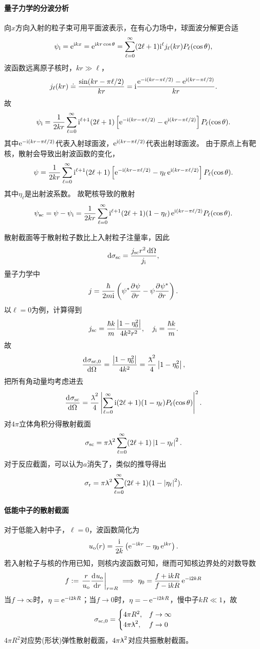 \paragraph{量子力学的分波分析}
向$x$方向入射的粒子束可用平面波表示，在有心力场中，球面波分解更合适
\[
	\psi_{\mathrm{i}}=\mathop{}\!\mathrm{e}^{\mathrm{i} kx}=\mathop{}\!\mathrm{e}^{\mathrm{i} kr\cos\theta}=\sum_{\ell=0}^\infty(2\ell+1)\mathrm{i}^\ell j_\ell(kr)P_\ell(\cos\theta),
\]
波函数远离原子核时，$kr\gg\ell$，
\[
	j_\ell(kr)\doteq\frac{\sin(kr-\pi\ell/2)}{kr}=\mathrm{i}\frac{\mathop{}\!\mathrm{e}^{-\mathrm{i}(kr-\pi\ell/2)}-\mathop{}\!\mathrm{e}^{\mathrm{i}(kr-\pi\ell/2)}}{kr}.
\]
故
\[
	\psi_{\mathrm{i}}=\frac1{2kr}\sum_{\ell=0}^\infty\mathrm{i}^{\ell+1}(2\ell+1)\left[\mathop{}\!\mathrm{e}^{-\mathrm{i}(kr-\pi\ell/2)}-\mathop{}\!\mathrm{e}^{\mathrm{i}(kr-\pi\ell/2)}\right]P_\ell(\cos\theta).
\]
其中$\mathop{}\!\mathrm{e}^{-\mathrm{i}(kr-\pi\ell/2)}$代表入射球面波，$\mathop{}\!\mathrm{e}^{\mathrm{i}(kr-\pi\ell/2)}$代表出射球面波。
由于原点上有靶核，散射会导致出射波函数的变化，
\[
	\psi=\frac1{2kr}\sum_{\ell=0}^\infty\mathrm{i}^{\ell+1}(2\ell+1)\left[\mathop{}\!\mathrm{e}^{-\mathrm{i}(kr-\pi\ell/2)}-\eta_\ell\mathop{}\!\mathrm{e}^{\mathrm{i}(kr-\pi\ell/2)}\right]P_\ell(\cos\theta).
\]
其中$\eta_\ell$是出射波系数。
故靶核导致的散射
\begin{align}
	\psi_{\mathrm{sc}}=\psi-\psi_{\mathrm{i}}=\frac1{2kr}\sum_{\ell=0}^\infty\mathrm{i}^{\ell+1}(2\ell+1)(1-\eta_\ell)\mathop{}\!\mathrm{e}^{\mathrm{i}(kr-\pi\ell/2)}P_\ell(\cos\theta).
\end{align}

散射截面等于散射粒子数比上入射粒子注量率，因此
\[
	\mathop{}\!\mathrm{d}\sigma_{\mathrm{sc}}=\frac{j_{\mathrm{sc}} r^2\mathop{}\!\mathrm{d}\Omega}{j_{\mathrm{i}}},
\]
量子力学中
\[
	j=\frac{\hbar}{2m\mathrm{i}}\left(\psi^\ast\frac{\partial^{{}}\psi}{\partial{r}^{{}}}-\psi\frac{\partial^{{}}\psi^\ast}{\partial{r}^{{}}}\right).
\]
以$\ell=0$为例，计算得到
\[
	j_{\mathrm{sc}}=\frac{\hbar k}m\frac{\left\lvert1-\eta_0^2\right\rvert}{4k^2r^2},\quad j_{\mathrm{i}}=\frac{\hbar k}m.
\]
故
\[
	\frac{\mathrm{d}^{{}}\sigma_{\mathrm{sc},0}}{\mathrm{d}{\Omega}^{{}}}=\frac{\left\lvert1-\eta_0^2\right\rvert}{4k^2}=\frac{{^-\!\!\!\!\lambda}^2}4\left\lvert1-\eta_0^2\right\rvert,
\]
把所有角动量均考虑进去
\[
	\frac{\mathrm{d}^{{}}\sigma_{\mathrm{sc}}}{\mathrm{d}{\Omega}^{{}}}=\frac{{^-\!\!\!\!\lambda}^2}4\left\lvert\sum_{\ell=0}^\infty\mathrm{i}(2\ell+1)(1-\eta_\ell)P_\ell(\cos\theta)\right\rvert^2.
\]
对$4\pi$立体角积分得散射截面
\begin{align}
	\sigma_{\mathrm{sc}}=\pi{^{_-}\!\!\!\!\lambda}^2\sum_{\ell=0}^\infty(2\ell+1)\left\lvert1-\eta_\ell\right\rvert^2.
\end{align}
对于反应截面，可以认为$a$消失了，类似的推导得出
\[
	\sigma_{\mathrm{r}}=\pi{^{_-}\!\!\!\!\lambda}^2\sum_{\ell=0}^\infty(2\ell+1)(1-\left\lvert\eta_\ell\right\rvert^2).
\]

\paragraph{低能中子的散射截面}对于低能入射中子，$\ell=0$，波函数简化为 
\[
	u_{\mathrm o}(r)=\frac{\mathrm{i}}{2k}\left(\mathop{}\!\mathrm{e}^{-\mathrm{i} kr}-\eta_0\mathop{}\!\mathrm{e}^{\mathrm{i} kr}\right).
\]
若入射粒子与核的作用已知，则核内波函数可知，继而可知核边界处的对数导数
\[
	f:=\left.\frac r{u_{\mathrm o}}\frac{\mathrm{d}^{{}}u_{\mathrm o}}{\mathrm{d}{r}^{{}}}\right\rvert_{r=R}\implies\eta_0=\frac{f+\mathrm{i} kR}{f-\mathrm{i} kR}\mathop{}\!\mathrm{e}^{-\mathrm{i}2kR}
\]
当$f\to\infty$时，$\eta=\mathop{}\!\mathrm{e}^{-\mathrm{i}2kR}$；当$f\to0$时，$\eta=-\mathop{}\!\mathrm{e}^{-\mathrm{i}2kR}$，慢中子$kR\ll 1$，故 
\begin{align}
	\sigma_{\mathrm{sc},0}=\begin{cases}
		4\pi R^2,&f\to\infty\\
		4\pi{^{_-}\!\!\!\!\lambda}^2,&f\to0
	\end{cases}
\end{align}
$4\pi R^2$对应势(形状)弹性散射截面，$4\pi{^{_-}\!\!\!\!\lambda}^2$对应共振散射截面。
